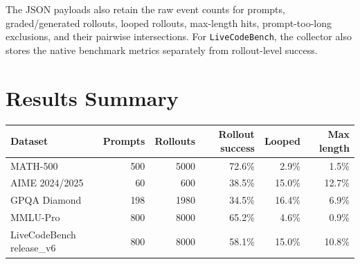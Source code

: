 \documentclass[11pt]{article}
\begin{document}
The JSON payloads also retain the raw event counts for prompts, graded/generated rollouts, looped rollouts, max-length hits, prompt-too-long exclusions, and their pairwise intersections. For \texttt{LiveCodeBench}, the collector also stores the native benchmark metrics separately from rollout-level success.

\section*{Results Summary}
\begin{tabular}{lrrrrr}
\toprule
Dataset & Prompts & Rollouts & Rollout success & Looped & Max length \\
\midrule
MATH-500 & 500 & 5000 & 72.6\% & 2.9\% & 1.5\% \\
AIME 2024/2025 & 60 & 600 & 38.5\% & 15.0\% & 12.7\% \\
GPQA Diamond & 198 & 1980 & 34.5\% & 16.4\% & 6.9\% \\
MMLU-Pro & 800 & 8000 & 65.2\% & 4.6\% & 0.9\% \\
LiveCodeBench release\_v6 & 800 & 8000 & 58.1\% & 15.0\% & 10.8\% \\
\bottomrule
\end{tabular}
\end{document}
